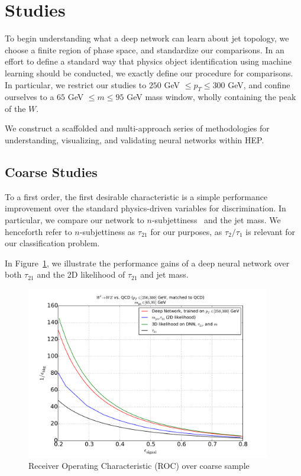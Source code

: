 \section{Studies} %
\label{sec:studies}

To begin understanding what a deep network can learn about jet topology, we choose a finite region of phase space, and standardize our comparisons. In an effort to define a standard way that physics object identification using machine learning should be conducted, we exactly define our procedure for comparisons. In particular, we restrict our studies to $250$ GeV $\leq p_T \leq 300$ GeV, and confine ourselves to a $65$ GeV $\leq m \leq 95$ GeV mass window, wholly containing the peak of the $W$. 

We construct a scaffolded and multi-approach series of methodologies for understanding, visualizing, and validating neural networks within HEP.

\subsection{Coarse Studies} %
\label{sub:coarse_studies}

To a first order, the first desirable characteristic is a simple performance improvement over the standard physics-driven variables for discrimination. In particular, we compare our network to $n$-subjettiness~\cite{nsub} and the jet mass. We henceforth refer to $n$-subjettiness as $\tau_{21}$ for our purposes, as $\tau_{2}/\tau_{1}$ is relevant for our classification problem.

In Figure~\ref{fig:combinedROC}, we illustrate the performance gains of a deep neural network over both $\tau_{21}$ and the 2D likelihood of $\tau_{21}$ and jet mass. 


\begin{figure}[!htbp]
  \centering
  \includegraphics[width=0.95\textwidth]{figures/combined-roc.pdf}
  \caption{Receiver Operating Characteristic (ROC) over coarse sample}
  \label{fig:combinedROC}
\end{figure}

